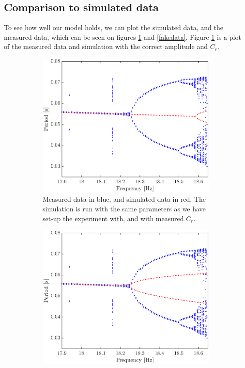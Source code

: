 \documentclass[12pt,oneside,a4paper]{article}
\numberwithin{equation}{section}
\begin{document}
{{{{\subsection{Comparison to simulated data}
To see how well our model holds, we can plot the simulated data, and the measured data, which can be seen on figures \ref{realdata} and \ref{fakedata}. Figure \ref{realdata} is a plot of the measured data and simulation with the correct amplitude and $C_r$.
\begin{figure}
\centering
\begin{subfigure}[t]{0.49\textwidth}
	\centering
	\includegraphics[width=\textwidth]{realvals}
	\caption{Measured data in blue, and simulated data in red. The simulation is run with the same parameters as we have set-up the experiment with, and with measured $C_r$.}
	\label{realdata}
\end{subfigure}\hfill
\begin{subfigure}[t]{0.49\textwidth}
	\centering
	\includegraphics[width=\textwidth]{fakevals}

\end{subfigure}
\end{figure}}}}}
\end{document}
